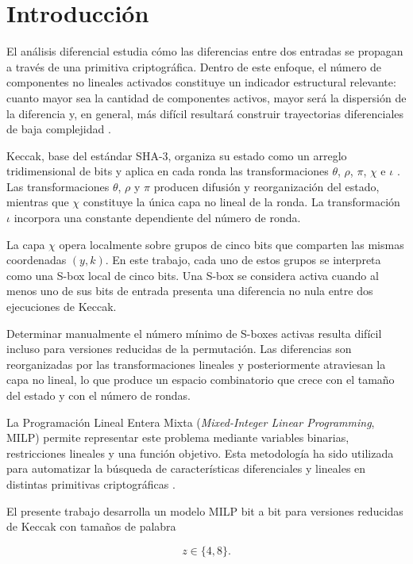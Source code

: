 \section{Introducción}
\label{sec:introduccion}

El análisis diferencial estudia cómo las diferencias entre dos entradas se
propagan a través de una primitiva criptográfica. Dentro de este enfoque, el
número de componentes no lineales activados constituye un indicador
estructural relevante: cuanto mayor sea la cantidad de componentes activos,
mayor será la dispersión de la diferencia y, en general, más difícil resultará
construir trayectorias diferenciales de baja complejidad
\cite{biham1991differential}.

Keccak, base del estándar SHA-3, organiza su estado como un arreglo
tridimensional de bits y aplica en cada ronda las transformaciones
$\theta$, $\rho$, $\pi$, $\chi$ e $\iota$
\cite{nist_fips202,bertoni2011keccak_reference}. Las transformaciones $\theta$, $\rho$
y $\pi$ producen difusión y reorganización del estado, mientras que $\chi$
constituye la única capa no lineal de la ronda. La transformación $\iota$
incorpora una constante dependiente del número de ronda.

La capa $\chi$ opera localmente sobre grupos de cinco bits que comparten las
mismas coordenadas $(y,k)$. En este trabajo, cada uno de estos grupos se
interpreta como una S-box local de cinco bits. Una S-box se considera activa
cuando al menos uno de sus bits de entrada presenta una diferencia no nula
entre dos ejecuciones de Keccak.

Determinar manualmente el número mínimo de S-boxes activas resulta difícil
incluso para versiones reducidas de la permutación. Las diferencias son
reorganizadas por las transformaciones lineales y posteriormente atraviesan
la capa no lineal, lo que produce un espacio combinatorio que crece con el
tamaño del estado y con el número de rondas.

La Programación Lineal Entera Mixta
(\emph{Mixed-Integer Linear Programming}, MILP) permite representar este
problema mediante variables binarias, restricciones lineales y una función
objetivo. Esta metodología ha sido utilizada para automatizar la búsqueda de
características diferenciales y lineales en distintas primitivas
criptográficas \cite{mouha2012milp,sun2014automatic}.

El presente trabajo desarrolla un modelo MILP bit a bit para versiones
reducidas de Keccak con tamaños de palabra

\[
z \in \{4,8\}.
\]

